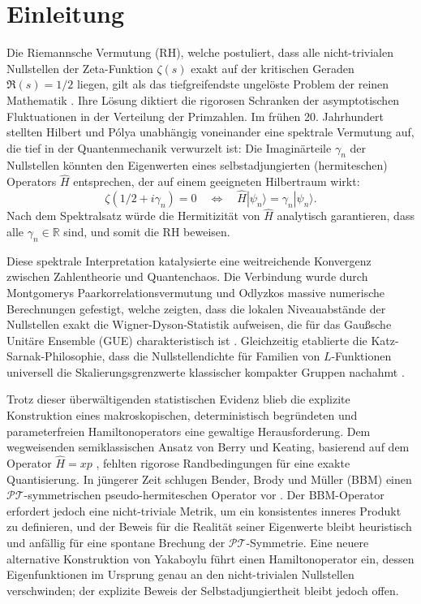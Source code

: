 \documentclass[aps,prl,preprint,superscriptaddress,floatfix]{revtex4-2}
\begin{document}
\maketitle

\section{Einleitung}

Die Riemannsche Vermutung (RH), welche postuliert, dass alle nicht-trivialen Nullstellen der Zeta-Funktion $\zeta(s)$ exakt auf der kritischen Geraden $\Re(s) = 1/2$ liegen, gilt als das tiefgreifendste ungelöste Problem der reinen Mathematik \cite{Riemann1859}. Ihre Lösung diktiert die rigorosen Schranken der asymptotischen Fluktuationen in der Verteilung der Primzahlen. Im frühen 20. Jahrhundert stellten Hilbert und Pólya unabhängig voneinander eine spektrale Vermutung auf, die tief in der Quantenmechanik verwurzelt ist: Die Imaginärteile $\gamma_n$ der Nullstellen könnten den Eigenwerten eines selbstadjungierten (hermiteschen) Operators $\hat{H}$ entsprechen, der auf einem geeigneten Hilbertraum wirkt:
\begin{equation}
\zeta(1/2 + i\gamma_n) = 0 \quad \Longleftrightarrow \quad \hat{H}|\psi_n\rangle = \gamma_n |\psi_n\rangle.
\end{equation}
Nach dem Spektralsatz würde die Hermitizität von $\hat{H}$ analytisch garantieren, dass alle $\gamma_n \in \mathbb{R}$ sind, und somit die RH beweisen.

Diese spektrale Interpretation katalysierte eine weitreichende Konvergenz zwischen Zahlentheorie und Quantenchaos. Die Verbindung wurde durch Montgomerys Paarkorrelationsvermutung \cite{Montgomery1973} und Odlyzkos massive numerische Berechnungen \cite{Odlyzko2001} gefestigt, welche zeigten, dass die lokalen Niveauabstände der Nullstellen exakt die Wigner-Dyson-Statistik aufweisen, die für das Gaußsche Unitäre Ensemble (GUE) charakteristisch ist \cite{Bohigas1984}. Gleichzeitig etablierte die Katz-Sarnak-Philosophie, dass die Nullstellendichte für Familien von $L$-Funktionen universell die Skalierungsgrenzwerte klassischer kompakter Gruppen nachahmt \cite{KatzSarnak1999}.

Trotz dieser überwältigenden statistischen Evidenz blieb die explizite Konstruktion eines makroskopischen, deterministisch begründeten und parameterfreien Hamiltonoperators eine gewaltige Herausforderung. Dem wegweisenden semiklassischen Ansatz von Berry und Keating, basierend auf dem Operator $\hat{H} = xp$ \cite{BerryKeating1999}, fehlten rigorose Randbedingungen für eine exakte Quantisierung. In jüngerer Zeit schlugen Bender, Brody und Müller (BBM) einen $\mathcal{PT}$-symmetrischen pseudo-hermiteschen Operator vor \cite{Bender2017}. Der BBM-Operator erfordert jedoch eine nicht-triviale Metrik, um ein konsistentes inneres Produkt zu definieren, und der Beweis für die Realität seiner Eigenwerte bleibt heuristisch und anfällig für eine spontane Brechung der $\mathcal{PT}$-Symmetrie. Eine neuere alternative Konstruktion von Yakaboylu \cite{Yakaboylu2024} führt einen Hamiltonoperator ein, dessen Eigenfunktionen im Ursprung genau an den nicht-trivialen Nullstellen verschwinden; der explizite Beweis der Selbstadjungiertheit bleibt jedoch offen.
\end{document}
